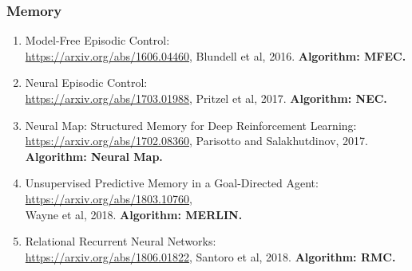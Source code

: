 \documentclass[lang=cn,11pt,a4paper]{elegant_template}
\begin{document}
\subsubsection{Memory}
\begin{enumerate}
    \item Model-Free Episodic Control:\\ \href{https://arxiv.org/abs/1606.04460}{https://arxiv.org/abs/1606.04460}, Blundell et al, 2016. \textbf{Algorithm: MFEC.}
    \item Neural Episodic Control:\\ \href{https://arxiv.org/abs/1703.01988}{https://arxiv.org/abs/1703.01988}, Pritzel et al, 2017. \textbf{Algorithm: NEC.}
    \item Neural Map: Structured Memory for Deep Reinforcement Learning:\\ \href{https://arxiv.org/abs/1702.08360}{https://arxiv.org/abs/1702.08360}, Parisotto and Salakhutdinov, 2017. \textbf{Algorithm: Neural Map.}
    \item Unsupervised Predictive Memory in a Goal-Directed Agent:\\ \href{https://arxiv.org/abs/1803.10760}{https://arxiv.org/abs/1803.10760}, \\ Wayne et al, 2018. \textbf{Algorithm: MERLIN.}
    \item Relational Recurrent Neural Networks:\\ \href{https://arxiv.org/abs/1806.01822}{https://arxiv.org/abs/1806.01822}, Santoro et al, 2018. \textbf{Algorithm: RMC.}
\end{enumerate}
\end{document}
